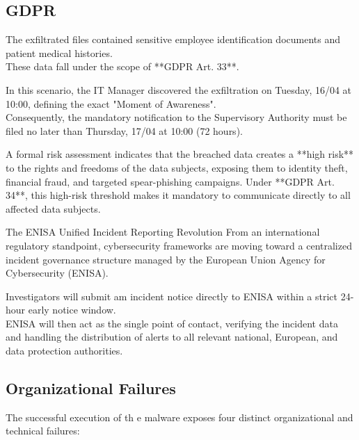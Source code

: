 \subsection{GDPR}
The exfiltrated files contained sensitive employee identification documents and patient medical histories.\\
These data fall under the scope of  **GDPR Art. 33**.
\medskip

\noindent
In this scenario, the IT Manager discovered the exfiltration on Tuesday, 16/04 at 10:00, defining the exact "Moment of Awareness".\\
Consequently, the mandatory notification to the Supervisory Authority must be filed no later than Thursday, 17/04 at 10:00 (72 hours).
\medskip

\noindent
A formal risk assessment indicates that the breached data creates a **high risk** to the rights and freedoms of the data subjects, exposing them to identity theft, financial fraud, and targeted spear-phishing campaigns. Under **GDPR Art. 34**, this high-risk threshold makes it mandatory to  communicate directly to all affected data subjects.
\medskip

\noindent
The ENISA Unified Incident Reporting Revolution
From an international regulatory standpoint, cybersecurity frameworks are moving toward a centralized incident governance structure managed by the European Union Agency for Cybersecurity (ENISA).
\medskip

\noindent
Investigators will submit am incident notice directly to ENISA within a strict 24-hour early notice window.\\
ENISA will then act as the single point of contact, verifying the incident data and handling the distribution of alerts to all relevant national, European, and data protection authorities. 

\subsection{Organizational Failures}
The successful execution of th e malware exposes four distinct organizational and technical failures:

